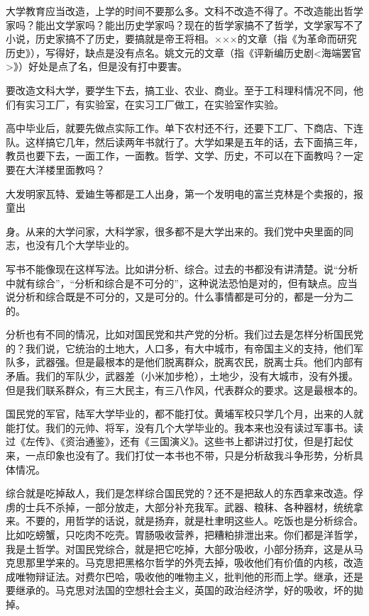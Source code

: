 大学教育应当改造，上学的时间不要那么多。文科不改造不得了。不改造能出哲学家吗？能出文学家吗？能出历史学家吗？现在的哲学家搞不了哲学，文学家写不了小说，历史家搞不了历史，要搞就是帝王将相。×××的文章（指《为革命而研究历史》），写得好，缺点是没有点名。姚文元的文章（指《评新编历史剧<海端罢官>》）好处是点了名，但是没有打中要害。

要改造文科大学，要学生下去，搞工业、农业、商业。至于工科理科情况不同，他们有实习工厂，有实验室，在实习工厂做工，在实验室作实验。

高中毕业后，就要先做点实际工作。单下农村还不行，还要下工厂、下商店、下连队。这样搞它几年，然后读两年书就行了。大学如果是五年的话，去下面搞三年，教员也要下去，一面工作，一面教。哲学、文学、历史，不可以在下面教吗？一定要在大洋楼里面教吗？

大发明家瓦特、爱廸生等都是工人出身，第一个发明电的富兰克林是个卖报的，报童出

身。从来的大学问家，大科学家，很多都不是大学出来的。我们党中央里面的同志，也没有几个大学毕业的。

写书不能像现在这样写法。比如讲分析、综合。过去的书都没有讲清楚。说“分析中就有综合”，“分析和综合是不可分的”，这种说法恐怕是对的，但有缺点。应当说分析和综合既是不可分的，又是可分的。什么事情都是可分的，都是一分为二的。

分析也有不同的情况，比如对国民党和共产党的分析。我们过去是怎样分析国民党的？我们说，它统治的土地大，人口多，有大中城市，有帝国主义的支持，他们军队多，武器强。但是最根本的是他们脱离群众，脱离农民，脱离士兵。他们内部有矛盾。我们的军队少，武器差（小米加步枪），土地少，没有大城市，没有外援。但是我们联系群众，有三大民主，有三八作风，代表群众的要求。这是最根本的。

国民党的军官，陆军大学毕业的，都不能打仗。黄埔军校只学几个月，出来的人就能打仗。我们的元帅、将军，没有几个大学毕业的。我本来也没有读过军事书。读过《左传》、《资治通鉴》，还有《三国演义》。这些书上都讲过打仗，但是打起仗来，一点印象也没有了。我们打仗一本书也不带，只是分析敌我斗争形势，分析具体情况。

综合就是吃掉敌人，我们是怎样综合国民党的？还不是把敌人的东西拿来改造。俘虏的士兵不杀掉，一部分放走，大部分补充我军。武器、粮秣、各种器材，统统拿来。不要的，用哲学的话说，就是扬弃，就是杜聿明这些人。吃饭也是分析综合。比如吃螃蟹，只吃肉不吃壳。胃肠吸收营养，把糟粕排泄出来。你们都是洋哲学，我是土哲学。对国民党综合，就是把它吃掉，大部分吸收，小部分扬弃，这是从马克思那里学来的。马克思把黑格尔哲学的外壳去掉，吸收他们有价值的内核，改造成唯物辩证法。对费尔巴哈，吸收他的唯物主义，批判他的形而上学。继承，还是要继承的。马克思对法国的空想社会主义，英国的政治经济学，好的吸收，坏的拋掉。

